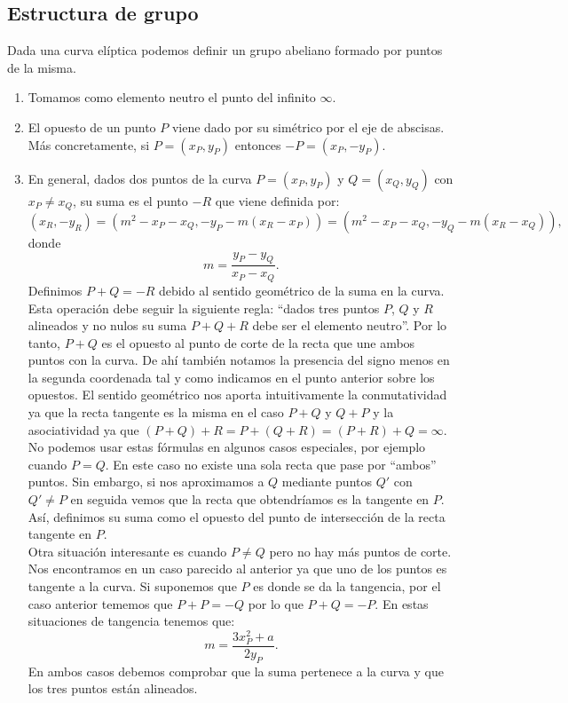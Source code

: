 \documentclass[11pt]{article}
\begin{document}
\subsection{Estructura de grupo}
Dada una curva elíptica podemos definir un grupo abeliano formado por puntos de la misma. 
\begin{enumerate}
\item Tomamos como elemento neutro el punto del infinito $\infty$.
\item El opuesto de un punto $ P $ viene dado por su simétrico por el eje de abscisas. Más concretamente, si $ P = (x_P, y_P) $ entonces $ -P = (x_P, -y_P) $.
\item En general, dados dos puntos de la curva $ P = (x_P, y_P) $ y $ Q = (x_Q, y_Q) $ con $ x_P \neq x_Q $, su suma es el punto $ -R $ que viene definida por:
\[
(x_R, -y_R) =(m^2 − x_P − x_Q, -y_P - m(x_R − x_P )) = (m^2 − x_P − x_Q, -y_Q - m(x_R − x_Q )),
\]
donde
\[
m = \frac{y_P-y_Q}{x_P-x_Q}.
\]
Definimos $ P+Q=-R $ debido al sentido geométrico de la suma en la curva. Esta operación debe seguir la siguiente regla: ``dados tres puntos $ P$, $ Q $ y $ R $ alineados y no nulos su suma $ P + Q + R $ debe ser el elemento neutro''. Por lo tanto, $ P +Q $ es el opuesto al punto de corte de la recta que une ambos puntos con la curva. De ahí también notamos la presencia del signo menos en la segunda coordenada tal y como indicamos en el punto anterior sobre los opuestos. El sentido geométrico nos aporta intuitivamente la conmutatividad ya que la recta tangente es la misma en el caso $ P+Q $ y $ Q+P $ y la asociatividad ya que $ (P+Q) + R = P + (Q+R) = (P+R) + Q = \infty$.\\

No podemos usar estas fórmulas en algunos casos especiales, por ejemplo cuando $ P=Q $. En este caso no existe una sola recta que pase por ``ambos'' puntos. Sin embargo, si nos aproximamos a $ Q $ mediante puntos $ Q' $ con $ Q' \neq P $ en seguida vemos que la recta que obtendríamos es la tangente en $ P $. Así, definimos su suma como el opuesto del punto de intersección de la recta tangente en $ P $.\\
Otra situación interesante es cuando $ P \neq Q $ pero no hay más puntos de corte. Nos encontramos en un caso parecido al anterior ya que uno de los puntos es tangente a la curva. Si suponemos que $ P $ es donde se da la tangencia, por el caso anterior tememos que $ P + P = -Q $ por lo que $ P + Q = -P $. En estas situaciones de tangencia tenemos que:
\[
m = \frac{3x^{2}_P + a}{2y_P}.
\]
En ambos casos debemos comprobar que la suma pertenece a la curva y que los tres puntos están alineados.


\end{enumerate}
\end{document}
